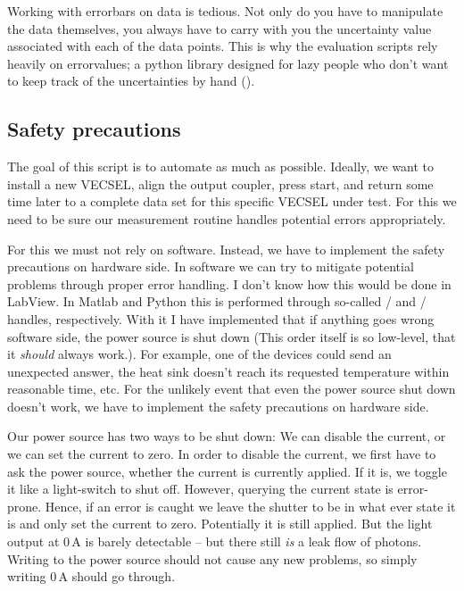 Working with errorbars on data
is tedious.
Not only do you have to
manipulate the data themselves,
you always have to carry with you
the uncertainty value
associated with each of the data points.
This is why the evaluation scripts
rely heavily on errorvalues;
a python library designed for
lazy people who don't want to
keep track of the uncertainties by hand
().


\subsection{Safety precautions}
\label{sec:routine:safety}

The goal of this script is to automate as much as possible.
Ideally,
we want to install a new VECSEL,
align the output coupler,
press start,
and return some time later to a complete data set
for this specific VECSEL under test.
For this we need to be sure
our measurement routine handles potential errors appropriately.

For this we must not rely on software.
Instead, we have to implement the safety precautions on hardware side.
In software we can try to mitigate
potential problems through proper error handling.
I don't know how this would be done in LabView.
In Matlab and Python this is performed through so-called
/ and / handles, respectively.
With it I have implemented that if anything goes wrong software side,
the power source is shut down
(This order itself is so low-level,
that it \emph{should} always work.).
For example, one of the devices could send an unexpected answer,
the heat sink doesn't reach its requested temperature within reasonable time, etc.
For the unlikely event
that even the power source shut down doesn't work,
we have to implement the safety precautions on hardware side.

Our power source has two ways to be shut down:
We can disable the current,
or we can set the current to zero.
In order to disable the current,
we first have to ask the power source,
whether the current is currently applied.
If it is, we toggle it like a light-switch to shut off.
However, querying the current state
is error-prone.
Hence, if an error is caught we leave the shutter to be in what ever state it is
and only set the current to zero.
Potentially it is still applied.
But the light output at $0\,\mathrm{A}$
is barely detectable --
but there still \emph{is} a leak flow of photons.
Writing to the power source should not cause any new problems,
so simply writing $0\,\mathrm{A}$ should go through.

